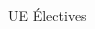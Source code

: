 \documentclass[t,compress,mathserif,12pt,xcolor=dvipsnames]{beamer}
\begin{document}
\begin{frame}[t]{UE \'Electives}
\begin{minipage}[t][5.0cm][t]{\textwidth}
\begin{columns}[T]
\begin{column}{0.04\textwidth}
      \end{column}
      \begin{column}{0.33\textwidth}

\end{column}
\end{columns}
\end{minipage}
\end{frame}
\end{document}
